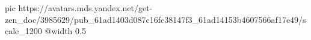  
 
 
 
 

\ifcmt
  pic https://avatars.mds.yandex.net/get-zen_doc/3985629/pub_61ad1403d087c16fc38147f3_61ad14153b4607566af17e49/scale_1200
  @width 0.5
\fi
